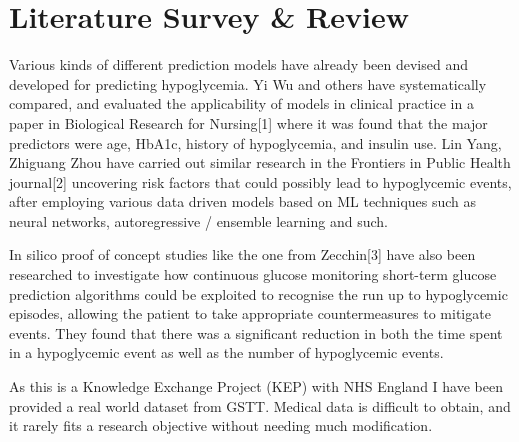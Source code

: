 
\section{Literature Survey \& Review} 

\begin{flushleft}
Various kinds of different prediction models have already been devised and developed for predicting hypoglycemia. Yi Wu and others have systematically compared, and evaluated the applicability of models in clinical practice in a paper in Biological Research for Nursing[1] 
where it was found that the major predictors were age, HbA1c, history of hypoglycemia, and insulin use. Lin Yang, Zhiguang Zhou have carried out similar research in the Frontiers in Public Health journal[2] uncovering risk factors that could possibly lead to hypoglycemic 
events, after employing various data driven models based on ML techniques such as neural networks, autoregressive / ensemble learning and such. \\ \vspace{5pt}

In silico proof of concept studies like the one from Zecchin[3] have also been researched to investigate how continuous glucose monitoring short-term glucose prediction algorithms could be exploited to recognise the run up to hypoglycemic episodes, allowing the patient to 
take appropriate countermeasures to mitigate events. They found that there was a significant reduction in both the time spent in a hypoglycemic event as well as the number 
of hypoglycemic events. \\ \vspace{5pt}

As this is a Knowledge Exchange Project (KEP) with NHS England I have been provided a real world dataset from GSTT. Medical data is difficult to obtain, and it rarely fits a research objective without needing much modification. 

\end{flushleft}